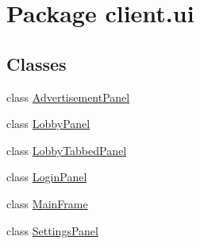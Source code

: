 \hypertarget{namespaceclient_1_1ui}{}\section{Package client.\+ui}
\label{namespaceclient_1_1ui}
\subsection*{Classes}
\begin{DoxyCompactItemize}
\item 
class \hyperlink{classclient_1_1ui_1_1_advertisement_panel}{Advertisement\+Panel}
\item 
class \hyperlink{classclient_1_1ui_1_1_lobby_panel}{Lobby\+Panel}
\item 
class \hyperlink{classclient_1_1ui_1_1_lobby_tabbed_panel}{Lobby\+Tabbed\+Panel}
\item 
class \hyperlink{classclient_1_1ui_1_1_login_panel}{Login\+Panel}
\item 
class \hyperlink{classclient_1_1ui_1_1_main_frame}{Main\+Frame}
\item 
class \hyperlink{classclient_1_1ui_1_1_settings_panel}{Settings\+Panel}
\end{DoxyCompactItemize}
